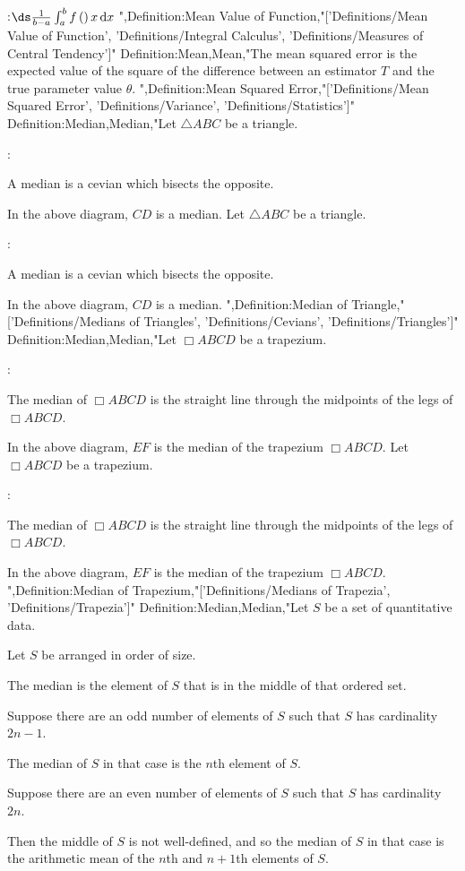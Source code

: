 :$\ds \frac 1 {b - a} \int_a^b f \left(   \right)x \,\mathrm d x$
",Definition:Mean Value of Function,"['Definitions/Mean Value of Function', 'Definitions/Integral Calculus', 'Definitions/Measures of Central Tendency']"
Definition:Mean,Mean,"The mean squared error is the expected value of the square of the difference between an estimator $T$ and the true parameter value $\theta$.
",Definition:Mean Squared Error,"['Definitions/Mean Squared Error', 'Definitions/Variance', 'Definitions/Statistics']"
Definition:Median,Median,"Let $\triangle ABC$ be a triangle.

:

A median is a cevian which bisects the opposite.


In the above diagram, $CD$ is a median.
Let $\triangle ABC$ be a triangle.

:

A median is a cevian which bisects the opposite.


In the above diagram, $CD$ is a median.
",Definition:Median of Triangle,"['Definitions/Medians of Triangles', 'Definitions/Cevians', 'Definitions/Triangles']"
Definition:Median,Median,"Let $\Box ABCD$ be a trapezium.

:

The median of $\Box ABCD$ is the straight line through the midpoints of the legs of $\Box ABCD$.


In the above diagram, $EF$ is the median of the trapezium $\Box ABCD$.
Let $\Box ABCD$ be a trapezium.

:

The median of $\Box ABCD$ is the straight line through the midpoints of the legs of $\Box ABCD$.


In the above diagram, $EF$ is the median of the trapezium $\Box ABCD$.
",Definition:Median of Trapezium,"['Definitions/Medians of Trapezia', 'Definitions/Trapezia']"
Definition:Median,Median,"Let $S$ be a set of quantitative data.

Let $S$ be arranged in order of size.

The median is the element of $S$ that is in the middle of that ordered set.


Suppose there are an odd number of elements of $S$ such that $S$ has cardinality $2 n - 1$.

The median of $S$ in that case is the $n$th element of $S$.


Suppose there are an even number of elements of $S$ such that $S$ has cardinality $2 n$.

Then the middle of $S$ is not well-defined, and so the median of $S$ in that case is the arithmetic mean of the $n$th and $n + 1$th elements of $S$.


